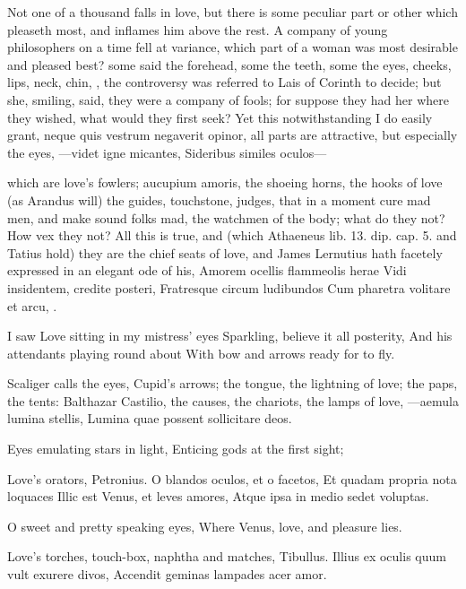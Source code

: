 {Not one of a thousand falls in love, but there is some peculiar part or
other which pleaseth most, and inflames him above the rest. A
company of young philosophers on a time fell at variance, which part of
a woman was most desirable and pleased best? some said the forehead,
some the teeth, some the eyes, cheeks, lips, neck, chin, \etc{}, the
controversy was referred to Lais of Corinth to decide; but she,
smiling, said, they were a company of fools; for suppose they had her
where they wished, what would they first seek? Yet this
notwithstanding I do easily grant, neque quis vestrum negaverit opinor,
all parts are attractive, but especially the eyes, 
---videt igne micantes,
Sideribus similes oculos---

which are love's fowlers; aucupium amoris, the shoeing horns, the
hooks of love (as Arandus will) the guides, touchstone, judges, that in
a moment cure mad men, and make sound folks mad, the watchmen of the
body; what do they not? How vex they not? All this is true, and (which
Athaeneus lib. 13. dip. cap. 5. and Tatius hold) they are the chief
seats of love, and James Lernutius hath facetely expressed in an
elegant ode of his,
Amorem ocellis flammeolis herae
Vidi insidentem, credite posteri,
Fratresque circum ludibundos
Cum pharetra volitare et arcu, \etc{}.

I saw Love sitting in my mistress' eyes
Sparkling, believe it all posterity,
And his attendants playing round about
With bow and arrows ready for to fly.

Scaliger calls the eyes, Cupid's arrows; the tongue, the
lightning of love; the paps, the tents: Balthazar Castilio, the
causes, the chariots, the lamps of love,
---aemula lumina stellis,
Lumina quae possent sollicitare deos.

Eyes emulating stars in light,
Enticing gods at the first sight;

Love's orators, Petronius.
O blandos oculos, et o facetos,
Et quadam propria nota loquaces
Illic est Venus, et leves amores,
Atque ipsa in medio sedet voluptas.

O sweet and pretty speaking eyes,
Where Venus, love, and pleasure lies.

Love's torches, touch-box, naphtha and matches, Tibullus.
Illius ex oculis quum vult exurere divos,
Accendit geminas lampades acer amor.

}
